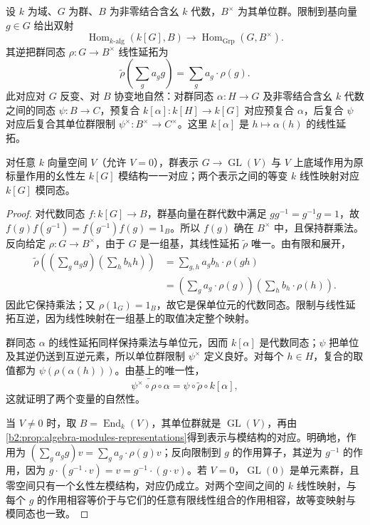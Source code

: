 \begin{proposition}\label{b2:prop:group-algebra-representations}
	设 \(k\) 为域、\(G\) 为群、\(B\) 为非零结合含幺 \(k\) 代数，\(B^\times\) 为其单位群。限制到基向量 \(g\in G\) 给出双射
	\[
		\operatorname{Hom}_{k\text{-alg}}(k[G],B) \longrightarrow\operatorname{Hom}_{\mathrm{Grp}}(G,B^\times).
	\]
	其逆把群同态 \(\rho:G\to B^\times\) 线性延拓为
	\[
		\widetilde\rho\left(\sum_g a_g g\right)=\sum_g a_g\cdot\rho(g).
	\]
	此对应对 \(G\) 反变、对 \(B\) 协变地自然：对群同态 \(\alpha:H\to G\) 及非零结合含幺 \(k\) 代数之间的同态 \(\psi:B\to C\)，预复合 \(k[\alpha]:k[H]\to k[G]\) 对应预复合 \(\alpha\)，后复合 \(\psi\) 对应后复合其单位群限制 \(\psi^\times:B^\times\to C^\times\)。这里 \(k[\alpha]\) 是 \(h\mapsto\alpha(h)\) 的线性延拓。

	对任意 \(k\) 向量空间 \(V\)（允许 \(V=0\)），群表示 \(G\to\operatorname{GL}(V)\) 与 \(V\) 上底域作用为原标量作用的幺性左 \(k[G]\) 模结构一一对应；两个表示之间的等变 \(k\) 线性映射对应 \(k[G]\) 模同态。
\end{proposition}
\begin{proof}
	对代数同态 \(f:k[G]\to B\)，群基向量在群代数中满足 \(gg^{-1}=g^{-1}g=1\)，故 \(f(g)f(g^{-1})=f(g^{-1})f(g)=1_B\)。所以 \(f(g)\) 确在 \(B^\times\) 中，且保持群乘法。反向给定 \(\rho:G\to B^\times\)，由于 \(G\) 是一组基，其线性延拓 \(\widetilde\rho\) 唯一。由有限和展开，
	\[
		\begin{aligned}
			\widetilde\rho\left(\left(\sum_g a_g g\right)\left(\sum_h b_h h\right)\right) &=\sum_{g,h}a_gb_h\cdot\rho(gh)\\
			&=\left(\sum_g a_g\cdot\rho(g)\right)\left(\sum_h b_h\cdot\rho(h)\right).
		\end{aligned}
	\]
	因此它保持乘法；又 \(\rho(1_G)=1_B\)，故它是保单位元的代数同态。限制与线性延拓互逆，因为线性映射在一组基上的取值决定整个映射。

	群同态 \(\alpha\) 的线性延拓同样保持乘法与单位元，因而 \(k[\alpha]\) 是代数同态；\(\psi\) 把单位及其逆仍送到互逆元素，所以单位群限制 \(\psi^\times\) 定义良好。对每个 \(h\in H\)，复合的取值都为 \(\psi(\rho(\alpha(h)))\)。由基上的唯一性，
	\[
		\widetilde{\psi^\times\circ\rho\circ\alpha} =\psi\circ\widetilde\rho\circ k[\alpha],
	\]
	这就证明了两个变量的自然性。

	当 \(V\ne0\) 时，取 \(B=\operatorname{End}_k(V)\)，其单位群就是 \(\operatorname{GL}(V)\)，再由\cref{b2:prop:algebra-modules-representations}得到表示与模结构的对应。明确地，作用为 \((\sum_g a_g g)v=\sum_g a_g\cdot\rho(g)v\)；反向限制到 \(g\) 的作用算子，其逆为 \(g^{-1}\) 的作用，因为 \(g\cdot(g^{-1}\cdot v)=v=g^{-1}\cdot(g\cdot v)\)。若 \(V=0\)，\(\operatorname{GL}(0)\) 是单元素群，且零空间只有一个幺性左模结构，对应仍成立。对两个空间之间的 \(k\) 线性映射，与每个 \(g\) 的作用相容等价于与它们的任意有限线性组合的作用相容，故等变映射与模同态也一致。
\end{proof}

